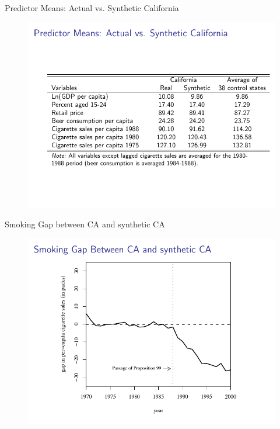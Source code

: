 \documentclass{beamer}
\begin{document}
\begin{frame}{Predictor Means: Actual vs. Synthetic California}
	
	\begin{figure}
	\includegraphics[scale=0.75]{./lecture_includes/abadie_5.pdf}
	\end{figure}
\end{frame}

\begin{frame}{Smoking Gap between CA and synthetic CA}
	
	\begin{figure}
	\includegraphics[scale=0.75]{./lecture_includes/abadie_6.pdf}
	\end{figure}
\end{frame}
\end{document}
